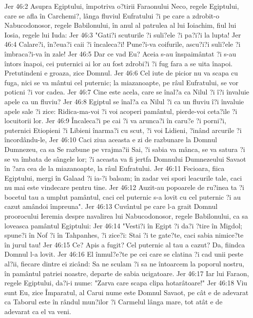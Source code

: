 Jer 46:2  Asupra Egiptului, împotriva o?tirii Faraonului Neco, regele Egiptului, care se afla în Carchemi?, lânga fluviul Eufratului ?i pe care a zdrobit-o Nabucodonosor, regele Babilonului, în anul al patrulea al lui Ioiachim, fiul lui Iosia, regele lui Iuda:
Jer 46:3  "Gati?i scuturile ?i suli?ele ?i pa?i?i la lupta!
Jer 46:4  Calare?i, în?eua?i caii ?i încaleca?i! Pune?i-va coifurile, ascu?i?i suli?ele ?i îmbraca?i-va în zale!
Jer 46:5  Dar ce vad Eu? Aceia s-au înspaimântat ?i s-au întors înapoi, cei puternici ai lor au fost zdrobi?i ?i fug fara a se uita înapoi. Pretutindeni e groaza, zice Domnul.
Jer 46:6  Cel iute de picior nu va scapa cu fuga, nici se va mântui cel puternic; la miazanoapte, pe râul Eufratului, se vor poticni ?i vor cadea.
Jer 46:7  Cine este acela, care se înal?a ca Nilul ?i î?i învaluie apele ca un fluviu?
Jer 46:8  Egiptul se înal?a ca Nilul ?i ca un fluviu î?i învaluie apele sale ?i zice: Ridica-ma-voi ?i voi acoperi pamântul, pierde-voi ceta?ile ?i locuitorii lor.
Jer 46:9  Încaleca?i pe cai ?i va arunca?i în caru?e ?i porni?i, puternici Etiopieni ?i Libieni înarma?i cu scut, ?i voi Lidieni, ?inând arcurile ?i încordându-le,
Jer 46:10  Caci ziua aceasta e zi de razbunare la Domnul Dumnezeu, ca sa Se razbune pe vrajma?ii Sai, ?i sabia va mânca, se va satura ?i se va îmbata de sângele lor; ?i aceasta va fi jertfa Domnului Dumnezeului Savaot în ?ara cea de la miazanoapte, la râul Eufratului.
Jer 46:11  Fecioara, fiica Egiptului, mergi în Galaad ?i ia-?i balsam; în zadar vei spori leacurile tale, caci nu mai este vindecare pentru tine.
Jer 46:12  Auzit-au popoarele de ru?inea ta ?i bocetul tau a umplut pamântul, caci cel puternic s-a lovit cu cel puternic ?i au cazut amândoi împreuna".
Jer 46:13  Cuvântul pe care l-a grait Domnul proorocului Ieremia despre navalirea lui Nabucodonosor, regele Babilonului, ca sa loveasca pamântul Egiptului:
Jer 46:14  "Vesti?i în Egipt ?i da?i ?tire în Migdol; spune?i în Nof ?i în Tahpanhes, ?i zice?i: Stai ?i te gate?te, caci sabia nimice?te în jurul tau!
Jer 46:15  Ce? Apis a fugit? Cel puternic al tau a cazut? Da, fiindca Domnul l-a lovit.
Jer 46:16  El înmul?e?te pe cei care se clatina ?i cad unii peste al?ii, fiecare dintre ei zicând: Sa ne sculam ?i sa ne întoarcem la poporul nostru, în pamântul patriei noastre, departe de sabia ucigatoare.
Jer 46:17  Iar lui Faraon, regele Egiptului, da?i-i nume: "Zarva care scapa clipa hotarâtoare!"
Jer 46:18  Viu sunt Eu, zice Împaratul, al Carui nume este Domnul Savaot, pe cât e de adevarat ca Taborul este în rândul mun?ilor ?i Carmelul lânga mare, tot atât e de adevarat ca el va veni.
